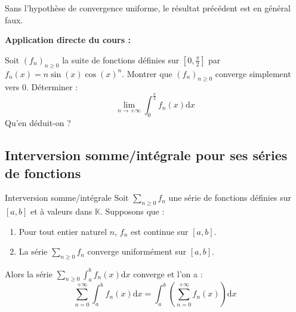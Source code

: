 \documentclass[french,11pt,twoside]{VcCours}
\newenvironment{ApplicationDirecte}{\textbf{Application directe du cours :}

}{}
\newcommand{\dx}{\text{d}x}
\begin{document}
\begin{Exemple}
%
%
%

\vspace*{15cm}
\end{Exemple}

\newpage

\begin{Remarque}{} Sans l'hypothèse de convergence uniforme, le résultat précédent est en général faux. 
\end{Remarque}

\begin{ApplicationDirecte} Soit $(f_n)_{n \geq 0}$ la suite de fonctions définies sur $[0, \frac{\pi}{2}]$ par $f_n(x)= n \sin(x) \cos(x)^n$. Montrer que $(f_n)_{n \geq 0}$ converge simplement vers $0$. Déterminer :
$$ \lim_{n \rightarrow + \infty} \int_{0}^{\frac{\pi}{2}} f_n(x) \dx$$
Qu'en déduit-on ?
\end{ApplicationDirecte}

\subsection{Interversion somme/intégrale pour ses séries de fonctions}

\begin{Theoreme}{Interversion somme/intégrale}  Soit $\sum_{n \geq 0} f_n$ une série de fonctions définies sur $[a,b]$ et à valeurs dans $\mathbb{K}$. Supposons que :

\begin{enumerate}
\item Pour tout entier naturel $n$, $f_n$ est continue sur $[a,b]$.
\item La série $\sum_{n \geq 0} f_n$ converge uniformément sur $[a,b]$.
\end{enumerate}
Alors la série $\sum_{n \geq 0} \int_{a}^b f_n(x) \dx$ converge et l'on a :
$$  \sum_{n = 0}^{+ \infty} \int_{a}^b f_n(x) \dx = \int_{a}^b  \left(\sum_{n=0}^{+ \infty} f_n(x) \right) \dx$$
\end{Theoreme}
\end{document}
